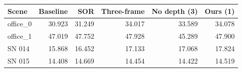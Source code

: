 \begin{tabular}{lrrrrr}
\toprule
Scene & Baseline & SOR & Three-frame & No depth (3) & Ours (1) \\
\midrule
office\_0 & 30.923 & 31.249 & 34.017 & 33.589 & 34.078 \\
office\_1 & 47.019 & 47.752 & 47.928 & 45.289 & 47.900 \\
SN 014 & 15.868 & 16.452 & 17.133 & 17.068 & 17.824 \\
SN 015 & 14.408 & 14.669 & 14.454 & 14.422 & 14.519 \\
\bottomrule
\end{tabular}
